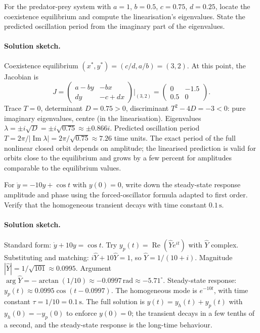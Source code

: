 \begin{exercise}
For the predator-prey system with $a = 1$, $b = 0.5$, $c = 0.75$,
$d = 0.25$, locate the coexistence equilibrium and compute the
linearisation's eigenvalues. State the predicted oscillation
period from the imaginary part of the eigenvalues.

\paragraph{Solution sketch.} Coexistence equilibrium $(x^{*},
y^{*}) = (c/d, a/b) = (3, 2)$. At this point, the Jacobian is
\[
J = \begin{pmatrix} a - b y & -b x \\ d y & -c + d x
\end{pmatrix}\bigg|_{(3,2)} = \begin{pmatrix} 0 & -1.5 \\ 0.5 & 0
\end{pmatrix}.
\]
Trace $T = 0$, determinant $D = 0.75 > 0$, discriminant $T^{2} -
4 D = -3 < 0$: pure imaginary eigenvalues, centre (in the
linearisation). Eigenvalues $\lambda = \pm i \sqrt{D} = \pm i
\sqrt{0.75} \approx \pm 0.866 i$. Predicted oscillation period $T
= 2\pi / |\operatorname{Im} \lambda| = 2\pi/\sqrt{0.75} \approx
7.26$ time units. The exact period of the full nonlinear closed
orbit depends on amplitude; the linearised prediction is valid
for orbits close to the equilibrium and grows by a few percent
for amplitudes comparable to the equilibrium values.
\end{exercise}

\begin{exercise}
For $\dot{y} = -10 y + \cos t$ with $y(0) = 0$, write down the
steady-state response amplitude and phase using the
forced-oscillator formula adapted to first order. Verify that the
homogeneous transient decays with time constant $0.1\,\si
{\second}$.

\paragraph{Solution sketch.} Standard form: $\dot{y} + 10 y =
\cos t$. Try $y_{p}(t) = \operatorname{Re}(\hat{Y} e^{i t})$ with
$\hat{Y}$ complex. Substituting and matching: $i \hat{Y} + 10
\hat{Y} = 1$, so $\hat{Y} = 1/(10 + i)$. Magnitude $|\hat{Y}| =
1/\sqrt{101} \approx 0.0995$. Argument $\arg \hat{Y} = -\arctan
(1/10) \approx -0.0997\,\si{\radian} \approx -5.71^{\circ}$.
Steady-state response: $y_{p}(t) \approx 0.0995 \cos(t -
0.0997)$. The homogeneous mode is $e^{-10 t}$, with time
constant $\tau = 1/10 = 0.1\,\si{\second}$. \checkmark The full
solution is $y(t) = y_{h}(t) + y_{p}(t)$ with $y_{h}(0) = -y_{p}(0)$
to enforce $y(0) = 0$; the transient decays in a few tenths of
a second, and the steady-state response is the long-time behaviour.
\end{exercise}

